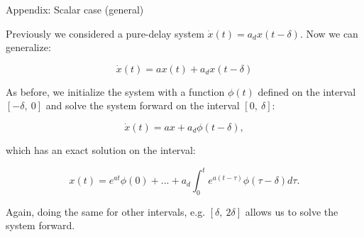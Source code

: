 \documentclass{beamer}
\begin{document}
\begin{frame}{Appendix: Scalar case (general)}
	\begin{flushleft}
		
		
		Previously we considered a pure-delay system $\dot{x}(t) = a_d x(t - \delta)$. Now we can generalize:
		
		\begin{equation}
			\dot{x}(t) = a x(t) + a_d x(t - \delta)
		\end{equation}
		
		As before, we initialize the system with a function $\phi(t)$ defined on the interval $[ -\delta, \  0]$ and solve the system forward on the interval $[0, \ \delta]$:
		
		\begin{equation}
			\dot{x}(t) = a x + a_d \phi(t - \delta),
		\end{equation}
		
		which has an exact solution on the interval:
		
		\begin{equation}
			x(t) = e^{a t} \phi(0) + ... + a_d \int_{0}^{t} e^{a (t - \tau)} \phi(\tau - \delta) d \tau.
		\end{equation}
		
		Again, doing the same for other intervals, e.g. $[\delta, \ 2\delta]$ allows us to solve the system forward.
		
	\end{flushleft}
\end{frame}
\end{document}
